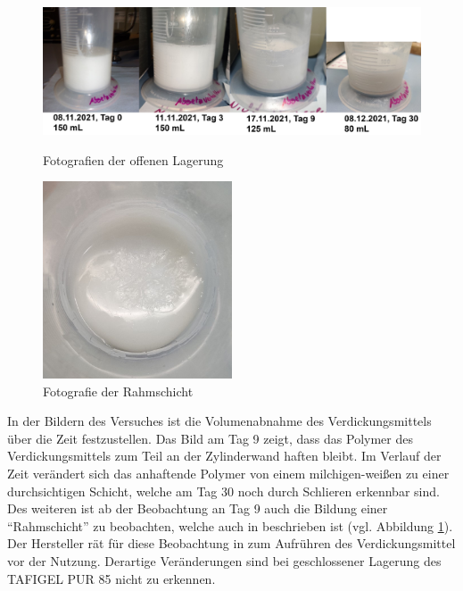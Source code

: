 \begin{figure}[h!]
	\begin{minipage}[b]{0.55\textwidth}
		\centering
		\includegraphics[width=1.1\textwidth]{img/lagerung}
		\caption{Fotografien der offenen Lagerung}
		\label{fig:lagerung}
	\end{minipage}
	\begin{minipage}[b]{0.42\textwidth}
		\centering
		\includegraphics[width=0.5\textwidth]{img/rahmschicht}
		\caption{Fotografie der Rahmschicht}
		\label{fig:rahmschicht}
	\end{minipage}
\end{figure}
\FloatBarrier

In der Bildern des Versuches ist die Volumenabnahme des Verdickungsmittels über die Zeit festzustellen. Das Bild am Tag 9 zeigt, dass das Polymer des Verdickungsmittels zum Teil an der Zylinderwand haften bleibt. Im Verlauf der Zeit verändert sich das anhaftende Polymer von einem milchigen-weißen zu einer durchsichtigen Schicht, welche am Tag 30 noch durch Schlieren erkennbar sind. Des weiteren ist ab der Beobachtung an Tag 9 auch die Bildung einer "`Rahmschicht"' zu beobachten, welche auch in \cite{MunzingChemieGmbH.2014} beschrieben ist (vgl. Abbildung \ref{fig:rahmschicht}). Der Hersteller rät für diese Beobachtung in \cite{MunzingChemieGmbH.2014} zum Aufrühren des Verdickungsmittel vor der Nutzung. Derartige Veränderungen sind bei geschlossener Lagerung des TAFIGEL PUR 85  nicht zu erkennen.


